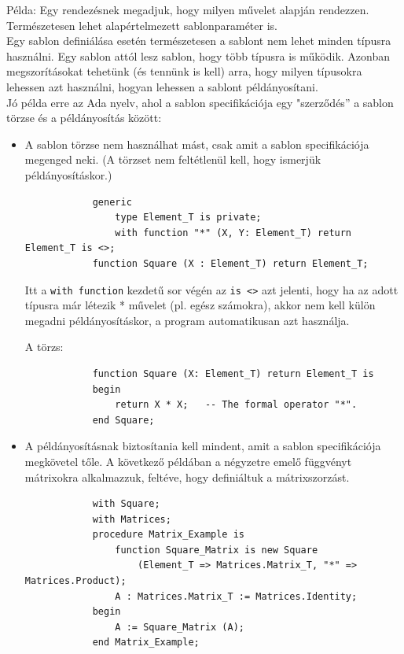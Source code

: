 \documentclass[12pt,margin=0px]{article}
\begin{document}
	\noindent Példa: Egy rendezésnek megadjuk, hogy milyen művelet alapján rendezzen.
	Természetesen lehet alapértelmezett sablonparaméter is.\\
	
	\noindent Egy sablon definiálása esetén természetesen a sablont nem lehet minden típusra használni. Egy sablon attól
	lesz sablon, hogy több típusra is működik. Azonban megszorításokat tehetünk (és tennünk is kell) arra, hogy
	milyen típusokra lehessen azt használni, hogyan lehessen a sablont példányosítani.\\

	\noindent Jó példa erre az Ada nyelv, ahol a sablon specifikációja egy "szerződés” a sablon törzse és a példányosítás
	között:
	
	\begin{itemize}
		\item	A sablon törzse nem használhat mást, csak amit a sablon specifikációja megenged neki. (A törzset
		nem feltétlenül kell, hogy ismerjük példányosításkor.)
		\begin{verbatim}
			generic
			    type Element_T is private;
			    with function "*" (X, Y: Element_T) return Element_T is <>;
			function Square (X : Element_T) return Element_T;
		\end{verbatim}
		Itt a \texttt{with function} kezdetű sor végén az \texttt{is <>} azt jelenti, hogy ha az adott típusra már létezik *
		művelet (pl. egész számokra), akkor nem kell külön megadni példányosításkor, a program automatikusan azt használja.
		
		A törzs:
		\begin{verbatim}
			function Square (X: Element_T) return Element_T is
			begin
			    return X * X;   -- The formal operator "*".
			end Square;
		\end{verbatim}
		
		\item	A példányosításnak biztosítania kell mindent, amit a sablon specifikációja megkövetel tőle.
		A következő példában a négyzetre emelő függvényt mátrixokra alkalmazzuk, feltéve, hogy definiáltuk a
		mátrixszorzást.
		\begin{verbatim}
			with Square;
			with Matrices;
			procedure Matrix_Example is
			    function Square_Matrix is new Square
			        (Element_T => Matrices.Matrix_T, "*" => Matrices.Product);
			    A : Matrices.Matrix_T := Matrices.Identity;
			begin
			    A := Square_Matrix (A);
			end Matrix_Example;
		\end{verbatim}
	\end{itemize}
\end{document}
